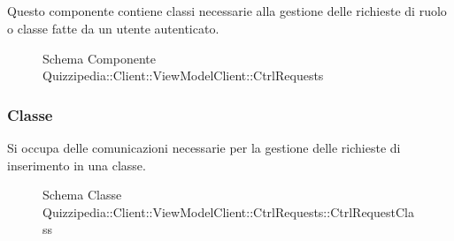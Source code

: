 \subsection{}
Questo componente contiene classi necessarie alla gestione delle richieste di ruolo o classe fatte da un utente autenticato.
\begin{figure}[H]
\centering
\noindent{}
\caption[Schema Componente Quizzipedia::Client::ViewModelClient::CtrlRequests]{Schema Componente Quizzipedia::Client::ViewModelClient::CtrlRequests}
\end{figure}
\subsubsection{Classe }
Si occupa delle comunicazioni necessarie per la gestione delle richieste di inserimento in una classe.
\begin{figure}[H]
\centering
\noindent{}
\caption[Schema Classe CtrlRequestClass]{Schema Classe Quizzipedia::Client::ViewModelClient::CtrlRequests::CtrlRequestClass}
\end{figure}
